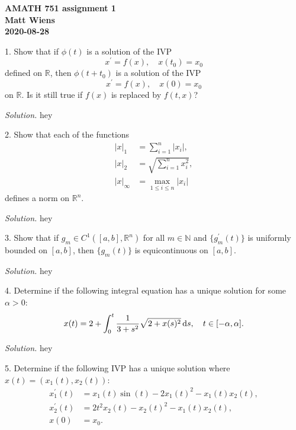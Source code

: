 \documentclass{article}
\newcommand{\N}{\mathbb{N}}
\newcommand{\R}{\mathbb{R}}
\begin{document}
\textbf{AMATH 751 assignment 1} \\
\textbf{Matt Wiens} \\
\textbf{2020-08-28}

1. Show that if $\phi(t)$ is a solution of the IVP
%
\begin{equation}
    x^\prime = f(x), \quad x(t_0) = x_0
    \label{eq:1-1}
\end{equation}
%
defined on $\R$, then $\phi(t + t_0)$ is a solution of the IVP
%
\begin{equation}
    x^\prime = f(x), \quad x(0) = x_0
    \label{eq:1-2}
\end{equation}
%
on $\R$. Is it still true if $f(x)$ is replaced by $f(t, x)$?

\textit{Solution.}
hey

\newpage

2. Show that each of the functions
%
\begin{align*}
    |x|_1 &= \sum_{i = 1}^n |x_i|, \\
    |x|_2 &= \sqrt{\sum_{i = 1}^n x_i^2}, \\
    |x|_\infty &= \max_{1 \leq i \leq n} |x_i|
\end{align*}
%
defines a norm on $\R^n$.

\textit{Solution.}
hey

\newpage

3. Show that if $g_m \in C^1([a, b], \R^n)$ for all $m \in \N$ and $\{g_m^\prime(t)\}$
is uniformly bounded on $[a, b]$, then $\{g_m(t)\}$ is equicontinuous on $[a, b]$.

\textit{Solution.}
hey

\newpage

4. Determine if the following integral equation has a unique solution for some $\alpha > 0$:
%
\begin{equation*}
    x(t) = 2 + \int_0^t \frac{1}{3 + s^2} \sqrt{2 + x(s)^2} \dif s, \quad t \in [-\alpha, \alpha]
    .
\end{equation*}

\textit{Solution.}
hey

\newpage

5. Determine if the following IVP has a unique solution where $x(t) = (x_1(t), x_2(t))$:
%
\begin{align*}
    x_1^\prime(t) &= x_1(t) \sin(t) - 2 x_1(t)^2 - x_1(t) x_2(t), \\
    x_2^\prime(t) &= 2 t^2 x_2(t) - x_2(t)^2 - x_1(t) x_2(t), \\
    x(0) &= x_0.
\end{align*}
\end{document}
